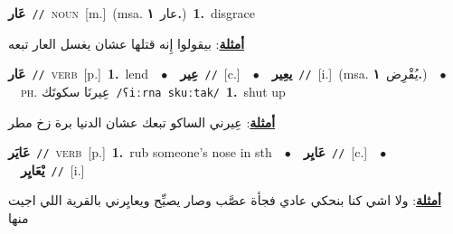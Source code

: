 \documentclass[10pt,a4paper,twoside]{article} %
\begin{document}
\begin{multicols}{2}
{\setlength\topsep{0pt}\textbf{\foreignlanguage{arabic}{عَار}}\ {\color{gray}\texttt{//}\color{black}}\ \textsc{noun}\ [m.]\ \color{gray}(msa. \foreignlanguage{arabic}{عار}~\foreignlanguage{arabic}{\textbf{١.}})\color{black}\ \textbf{1.}~disgrace\  \begin{flushright}\color{gray}\foreignlanguage{arabic}{\textbf{\underline{\foreignlanguage{arabic}{أمثلة}}}: بيقولوا إِنه قتلها عشان يغسل العار تبعه}\end{flushright}\color{black}} \vspace{2mm}

{\setlength\topsep{0pt}\textbf{\foreignlanguage{arabic}{عَار}}\ {\color{gray}\texttt{//}\color{black}}\ \textsc{verb}\ [p.]\ \textbf{1.}~lend\ \ $\bullet$\ \ \setlength\topsep{0pt}\textbf{\foreignlanguage{arabic}{عِير}}\ {\color{gray}\texttt{//}\color{black}}\ [c.]\ \ $\bullet$\ \ \setlength\topsep{0pt}\textbf{\foreignlanguage{arabic}{يعِير}}\ {\color{gray}\texttt{//}\color{black}}\ [i.]\ \color{gray}(msa. \foreignlanguage{arabic}{يُقْرِض}~\foreignlanguage{arabic}{\textbf{١.}})\color{black}\ \ $\bullet$\ \ \textsc{ph.} \color{gray} \foreignlanguage{arabic}{عِيرنَا سكوتَك}\color{black}\ {\color{gray}\texttt{/{\sffamily ʕiːrna skuːtak}/}\color{black}}\ \textbf{1.}~shut up\  \begin{flushright}\color{gray}\foreignlanguage{arabic}{\textbf{\underline{\foreignlanguage{arabic}{أمثلة}}}: عِيرني الساكو تبعك عشان الدنيا برة زخ مطر}\end{flushright}\color{black}} \vspace{2mm}

{\setlength\topsep{0pt}\textbf{\foreignlanguage{arabic}{عَايَر}}\ {\color{gray}\texttt{//}\color{black}}\ \textsc{verb}\ [p.]\ \textbf{1.}~rub someone's nose in sth\ \ $\bullet$\ \ \setlength\topsep{0pt}\textbf{\foreignlanguage{arabic}{عَايِر}}\ {\color{gray}\texttt{//}\color{black}}\ [c.]\ \ $\bullet$\ \ \setlength\topsep{0pt}\textbf{\foreignlanguage{arabic}{يْعَايِر}}\ {\color{gray}\texttt{//}\color{black}}\ [i.]\  \begin{flushright}\color{gray}\foreignlanguage{arabic}{\textbf{\underline{\foreignlanguage{arabic}{أمثلة}}}: ولا اشي كنا بنحكي عادي فجأة عصَّب وصار يصيِّح ويعايِرني بالقرية اللي اجيت منها}\end{flushright}\color{black}} \vspace{2mm}


\end{multicols}
\end{document}
